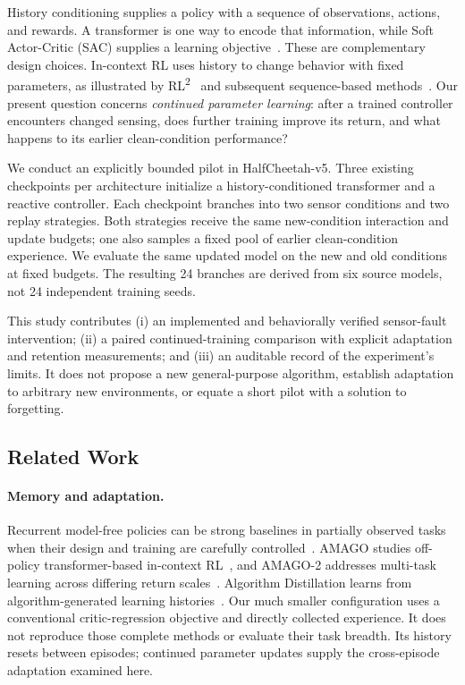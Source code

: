 \documentclass[runningheads]{llncs}
\begin{document}
History conditioning supplies a policy with a sequence of observations, actions, and rewards. A transformer is one way to encode that information, while Soft Actor-Critic (SAC) supplies a learning objective~\cite{sac}. These are complementary design choices. In-context RL uses history to change behavior with fixed parameters, as illustrated by RL\textsuperscript{2}~\cite{rl2} and subsequent sequence-based methods~\cite{amago,ad}. Our present question concerns \emph{continued parameter learning}: after a trained controller encounters changed sensing, does further training improve its return, and what happens to its earlier clean-condition performance?

We conduct an explicitly bounded pilot in HalfCheetah-v5. Three existing checkpoints per architecture initialize a history-conditioned transformer and a reactive controller. Each checkpoint branches into two sensor conditions and two replay strategies. Both strategies receive the same new-condition interaction and update budgets; one also samples a fixed pool of earlier clean-condition experience. We evaluate the same updated model on the new and old conditions at fixed budgets. The resulting 24 branches are derived from six source models, not 24 independent training seeds.

This study contributes (i) an implemented and behaviorally verified sensor-fault intervention; (ii) a paired continued-training comparison with explicit adaptation and retention measurements; and (iii) an auditable record of the experiment's limits. It does not propose a new general-purpose algorithm, establish adaptation to arbitrary new environments, or equate a short pilot with a solution to forgetting.

\subsection{Related Work}
\paragraph{Memory and adaptation.}
Recurrent model-free policies can be strong baselines in partially observed tasks when their design and training are carefully controlled~\cite{ni}. AMAGO studies off-policy transformer-based in-context RL~\cite{amago}, and AMAGO-2 addresses multi-task learning across differing return scales~\cite{amago2}. Algorithm Distillation learns from algorithm-generated learning histories~\cite{ad}. Our much smaller configuration uses a conventional critic-regression objective and directly collected experience. It does not reproduce those complete methods or evaluate their task breadth. Its history resets between episodes; continued parameter updates supply the cross-episode adaptation examined here.
\end{document}
